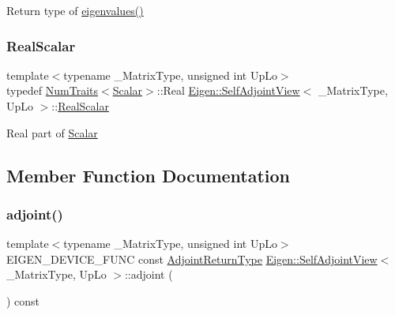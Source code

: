 Return type of \mbox{\hyperlink{class_eigen_1_1_self_adjoint_view_ad4f34424b4ea12de9bbc5623cb938b4f}{eigenvalues()}} \mbox{\label{class_eigen_1_1_self_adjoint_view_af9f0234ebeae4c4ca512bcd5fb5e8bb1}} 
\subsubsection{\texorpdfstring{RealScalar}{RealScalar}}
{\footnotesize\ttfamily template$<$typename \+\_\+\+Matrix\+Type, unsigned int Up\+Lo$>$ \\
typedef \mbox{\hyperlink{struct_eigen_1_1_num_traits}{Num\+Traits}}$<$\mbox{\hyperlink{class_eigen_1_1_self_adjoint_view_af52acc0942ece2de9b6db4a99cc6656e}{Scalar}}$>$\+::Real \mbox{\hyperlink{class_eigen_1_1_self_adjoint_view}{Eigen\+::\+Self\+Adjoint\+View}}$<$ \+\_\+\+Matrix\+Type, Up\+Lo $>$\+::\mbox{\hyperlink{class_eigen_1_1_self_adjoint_view_af9f0234ebeae4c4ca512bcd5fb5e8bb1}{Real\+Scalar}}}

Real part of \mbox{\hyperlink{class_eigen_1_1_self_adjoint_view_af52acc0942ece2de9b6db4a99cc6656e}{Scalar}} 

\subsection{Member Function Documentation}
\mbox{\label{class_eigen_1_1_self_adjoint_view_a2c19217199aaec1dc208f0e3f437dae6}} 
\subsubsection{\texorpdfstring{adjoint()}{adjoint()}}
{\footnotesize\ttfamily template$<$typename \+\_\+\+Matrix\+Type, unsigned int Up\+Lo$>$ \\
E\+I\+G\+E\+N\+\_\+\+D\+E\+V\+I\+C\+E\+\_\+\+F\+U\+NC const \mbox{\hyperlink{class_eigen_1_1_self_adjoint_view}{Adjoint\+Return\+Type}} \mbox{\hyperlink{class_eigen_1_1_self_adjoint_view}{Eigen\+::\+Self\+Adjoint\+View}}$<$ \+\_\+\+Matrix\+Type, Up\+Lo $>$\+::adjoint (\begin{DoxyParamCaption}{ }\end{DoxyParamCaption}) const\hspace{0.3cm}{\ttfamily [inline]}}

